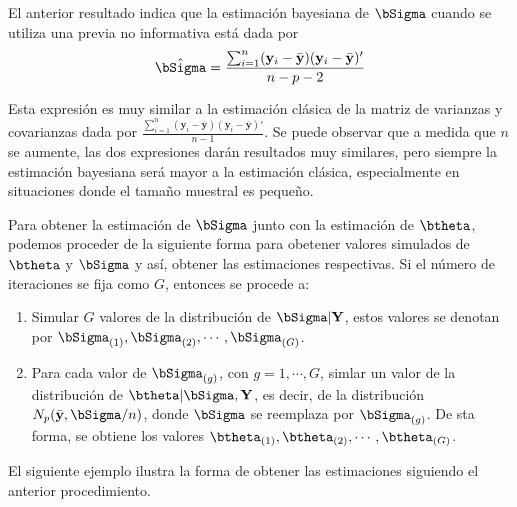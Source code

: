 \documentclass[10pt,openright]{book}\usepackage[]{graphicx}\usepackage[]{color}
\begin{document}
El anterior resultado indica que la estimaci\'on bayesiana de $\bSigma$ cuando se utiliza una previa no informativa est\'a dada por 
\begin{equation*}
\hat{\bSigma}=\frac{\sum_{i=1}^n(\mathbf{y}_i-\bar{\mathbf{y}})(\mathbf{y}_i-\bar{\mathbf{y}})'}{n-p-2}
\end{equation*}

Esta expresi\'on es muy similar a la estimaci\'on cl\'asica de la matriz de varianzas y covarianzas dada por $\frac{\sum_{i=1}^n(\mathbf{y}_i-\bar{\mathbf{y}})(\mathbf{y}_i-\bar{\mathbf{y}})'}{n-1}$. Se puede observar que a medida que $n$ se aumente, las dos expresiones dar\'an resultados muy similares, pero siempre la estimaci\'on bayesiana ser\'a mayor a la estimaci\'on cl\'asica, especialmente en situaciones donde el tama\~no muestral es peque\~no.

Para obtener la estimaci\'on de $\bSigma$ junto con la estimaci\'on de $\btheta$, podemos proceder de la siguiente forma para obetener valores simulados de $\btheta$ y $\bSigma$ y as\'i, obtener las estimaciones respectivas. Si el n\'umero de iteraciones se fija como $G$, entonces se procede a:
\begin{enumerate}[(1)]
\item Simular $G$ valores de la distribuci\'on de $\bSigma|\mathbf{Y}$, estos valores se denotan por $\bSigma_{(1)},\bSigma_{(2)},\cdots,\bSigma_{(G)}$.
\item  Para cada valor de $\bSigma_{(g)}$, con $g=1,\cdots,G$, simlar un valor de la distribuci\'on de $\btheta|\bSigma,\mathbf{Y}$, es decir, de la distribuci\'on $N_p(\bar{\mathbf{y}}, \bSigma/n)$, donde $\bSigma$ se reemplaza por $\bSigma_{(g)}$. De sta forma, se obtiene los valores $\btheta_{(1)},\btheta_{(2)},\cdots,\btheta_{(G)}$.
\end{enumerate}

El siguiente ejemplo ilustra la forma de obtener las estimaciones siguiendo el anterior procedimiento. 
\end{document}
